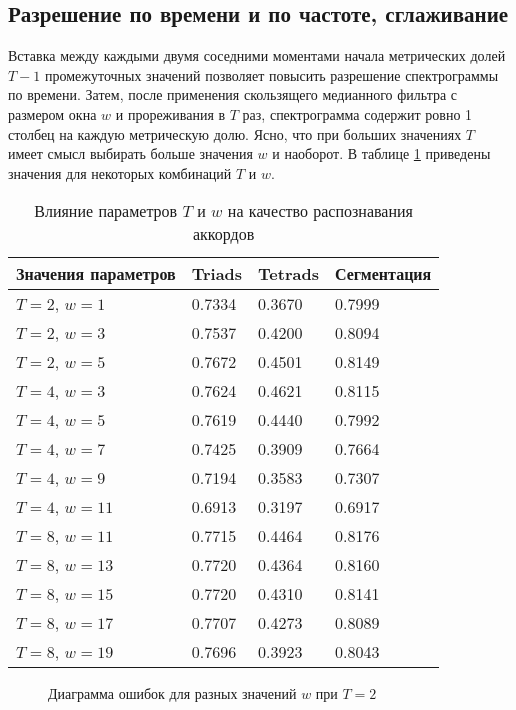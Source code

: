 \subsection{Разрешение по времени и по частоте, сглаживание} \label{ssect3_Tw}

Вставка между каждыми двумя соседними моментами начала метрических долей
$T-1$ промежуточных значений позволяет повысить разрешение спектрограммы по
времени. Затем, после применения скользящего медианного фильтра с размером окна
$w$ и прореживания в $T$ раз, спектрограмма содержит ровно 1 столбец на каждую
метрическую долю. Ясно, что при больших значениях $T$ имеет смысл выбирать
больше значения $w$ и наоборот. В таблице \ref{TTw} приведены значения для
некоторых комбинаций $T$ и $w$.

\begin{table} [htbp]
  \centering
  \parbox{15cm}{\caption{Влияние параметров $T$ и $w$ на качество распознавания
  аккордов} \label{TTw}}
  \begin{tabular}{|l|l|l|l|}
  \hline
  Значения параметров & Triads & Tetrads & Сегментация \\
  \hline
  $T = 2$, $w = 1$ & 0.7334 & 0.3670 & 0.7999 \\
  $T = 2$, $w = 3$ & 0.7537 & 0.4200 & 0.8094 \\
  $T = 2$, $w = 5$ & 0.7672 & 0.4501 & 0.8149 \\
  \hline
  $T = 4$, $w = 3$ & 0.7624 & 0.4621 & 0.8115 \\
  $T = 4$, $w = 5$ & 0.7619 & 0.4440 & 0.7992 \\
  $T = 4$, $w = 7$ & 0.7425 & 0.3909 & 0.7664 \\
  $T = 4$, $w = 9$ & 0.7194 & 0.3583 & 0.7307 \\
  $T = 4$, $w = 11$ & 0.6913 & 0.3197 & 0.6917 \\
  \hline
  $T = 8$, $w = 11$ & 0.7715 & 0.4464 & 0.8176 \\
  $T = 8$, $w = 13$ & 0.7720 & 0.4364 & 0.8160 \\
  $T = 8$, $w = 15$ & 0.7720 & 0.4310 & 0.8141 \\
  $T = 8$, $w = 17$ & 0.7707 & 0.4273 & 0.8089 \\
  $T = 8$, $w = 19$ & 0.7696 & 0.3923 & 0.8043 \\
  \hline
  \end{tabular}
\end{table}

\begin{figure}[h]
  \begin{minipage}[h]{0.49\linewidth}
  \end{minipage}
  \hfill
  \begin{minipage}[h]{0.49\linewidth}
  \end{minipage}
  \caption{Диаграмма ошибок для разных значений $w$ при $T=2$}
  \label{img:T2}
\end{figure}

